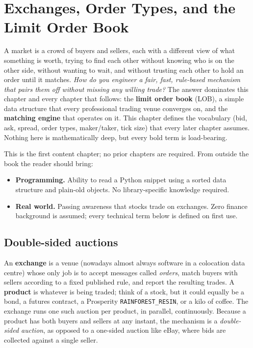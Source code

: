 \chapter{Exchanges, Order Types, and the Limit Order Book}
\label{ch:lob}

A market is a crowd of buyers and sellers, each with a different view
of what something is worth, trying to find each other without knowing
who is on the other side, without wanting to wait, and without
trusting each other to hold an order until it matches.
\emph{How do you engineer a fair, fast, rule-based mechanism that
pairs them off without missing any willing trade?} The answer
dominates this chapter and every chapter that follows: the
\textbf{limit order book} (LOB), a simple data structure that every
professional trading venue converges on, and the \textbf{matching
engine} that operates on it. This chapter defines the vocabulary
(bid, ask, spread, order types, maker/taker, tick size) that every
later chapter assumes. Nothing here is mathematically deep, but every
bold term is load-bearing.

\begin{backgroundbox}[Prerequisites]
This is the first content chapter; no prior chapters are required.
From outside the book the reader should bring:
\begin{itemize}
  \item \textbf{Programming.} Ability to read a Python snippet using a
  sorted data structure and plain-old objects. No library-specific
  knowledge required.
  \item \textbf{Real world.} Passing awareness that stocks trade on
  exchanges. Zero finance background is assumed; every technical term
  below is defined on first use.
\end{itemize}
\end{backgroundbox}

\section{Double-sided auctions}
\label{sec:double_sided}

An \textbf{exchange} is a venue (nowadays almost always software in
a colocation data centre) whose only job is to accept messages
called \emph{orders}, match buyers with sellers according to a fixed
published rule, and report the resulting trades. A \textbf{product} is
whatever is being traded; think of a stock, but it could equally be a
bond, a futures contract, a Prosperity \texttt{RAINFOREST\_RESIN}, or
a kilo of coffee. The exchange runs one such auction per product, in
parallel, continuously. Because a product has both buyers and sellers
at any instant, the mechanism is a \emph{double-sided auction}, as
opposed to a one-sided auction like eBay, where bids are collected
against a single seller.

